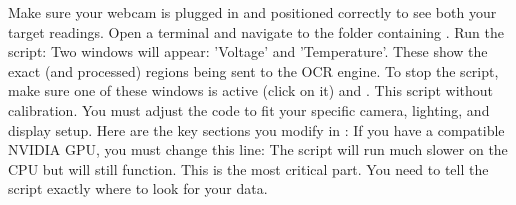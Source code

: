 \markdownRendererUlEnd \markdownRendererInterblockSeparator
{}
\markdownRendererSectionEnd 
\markdownRendererSectionEnd \markdownRendererSectionBegin
{}\markdownRendererInterblockSeparator
{}\markdownRendererOlBeginTight
{}Make sure your webcam is plugged in and positioned correctly to see both your target readings.\markdownRendererOlItemEnd 
{}Open a terminal and navigate to the folder containing .\markdownRendererOlItemEnd 
{}Run the script:\markdownRendererInterblockSeparator
{}\markdownRendererOlItemEnd 
{}Two windows will appear: 'Voltage' and 'Temperature'. These show the exact (and processed) regions being sent to the OCR engine.\markdownRendererOlItemEnd 
{}To stop the script, make sure one of these windows is active (click on it) and .\markdownRendererOlItemEnd 
\markdownRendererOlEndTight \markdownRendererParagraphSeparator
{}
\markdownRendererSectionEnd \markdownRendererSectionBegin
{}\markdownRendererInterblockSeparator
{}This script  without calibration. You must adjust the code to fit your specific camera, lighting, and display setup.\markdownRendererParagraphSeparator
{}Here are the key sections you  modify in :\markdownRendererInterblockSeparator
{}\markdownRendererSectionBegin
{}\markdownRendererInterblockSeparator
{}If you  have a compatible NVIDIA GPU, you must change this line:\markdownRendererInterblockSeparator
{}\markdownRendererInterblockSeparator
{}The script will run much slower on the CPU but will still function.\markdownRendererInterblockSeparator
{}
\markdownRendererSectionEnd \markdownRendererSectionBegin
{}\markdownRendererInterblockSeparator
{}This is the most critical part. You need to tell the script exactly where to look for your data.\markdownRendererInterblockSeparator
